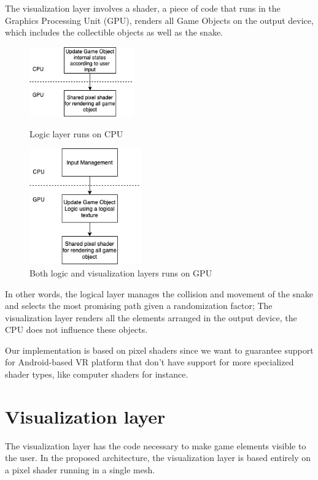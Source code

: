 \documentclass[runningheads]{llncs}
\begin{document}
The visualization layer involves a shader, a piece of code that runs in the Graphics Processing Unit (GPU), renders all Game Objects on the output device, which includes the collectible objects as well as the snake.

\begin{figure}
    \centering
    \begin{minipage}[b][6cm][b]{.5\textwidth}
        \centering
        \includegraphics[height=3cm]{hci2020-paper/images/VRSnake_Proposed_Architecture.png}
        \caption{Logic layer runs on CPU}
        \label{fig:coupledModel}
    \end{minipage}%
    \begin{minipage}[b][6cm][b]{.5\textwidth}
        \centering
        \includegraphics[height=5cm]{hci2020-paper/images/VRSnake_Proposed_Architecture2.png}
        \caption{Both logic and visualization layers runs on GPU}
        \label{fig:uncoupledModel}
    \end{minipage}
\end{figure}

In other words, the logical layer manages the collision and movement of the snake and selects the most promising path given a randomization factor; The visualization layer renders all the elements arranged in the output device, the CPU does not influence these objects.

Our implementation is based on pixel shaders since we want to guarantee support for Android-based VR platform that don't have support for more specialized shader types, like computer shaders for instance.

\section{Visualization layer}
\label{sec:visualization-layer}
The visualization layer has the code necessary to make game elements visible to the user. In the proposed architecture, the visualization layer is based entirely on a pixel shader running in a single mesh.
\end{document}
